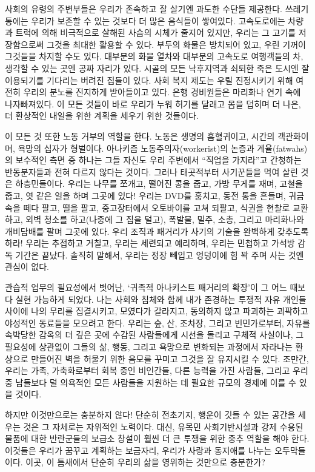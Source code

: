\documentclass[10pt, b6paper, openany]{memoir}
\begin{document}
\begin{article}
사회의 유령의 주변부들은 우리가 존속하고 잘 살기엔 과도한 수단들 제공한다. 쓰레기통에는 우리가 보존할 수 있는 것보다 더 많은 음식들이 쌓여있다. 고속도로에는 차량과 트럭에 의해 비극적으로 살해된 사슴의 시체가 줄지어 있지만, 우리는 그 고기를 저장함으로써 그것을 최대한 활용할 수 있다. 부두의 화물은 방치되어 있고, 우린 기꺼이 그것들을 차지할 수도 있다. 대부분의 화물 열차와 대부분의 고속도로 여행객들의 차, 생각할 수 있는 곳엔 공짜 자리가 있다. 시골의 모든 낙후지역과 쇠퇴한 죽은 도시엔 잘 이용되기를 기다리는 버려진 집들이 있다. 사회 복지 제도는 우릴 진정시키기 위해 여전히 우리의 분노를 진지하게 받아들이고 있다. 은행 경비원들은 마리화나 연기 속에 나자빠져있다. 이 모든 것들이 바로 우리가 누워 허기를 달래고 몸을 덥히며 더 나은, 더 환상적인 내일을 위한 계획을 세우기 위한 것들이다.

이 모든 것 또한 노동 거부의 역할을 한다. 노동은 생명의 흡혈귀이고, 시간의 객관화이며, 욕망의 십자가 형벌이다. 아나키즘 노동주의자(workerist)의 논증과 계율(fatwahs)의 보수적인 측면 중 하나는 그들 자신도 우리 주변에서 ``직업을 가지라''고 간청하는 반동분자들과 전혀 다르지 않다는 것이다. 그러나 태곳적부터 사기꾼들을 먹여 살린 것은 하층민들이다. 우리는 나무를 쪼개고, 떨어진 콩을 줍고, 가방 무게를 재며, 고철을 줍고, 엿 같은 일을 하며 그곳에 있다! 우리는 DVD를 훔치고, 동전 통을 흔들며, 귀금속을 떼다 팔고, 떨을 팔고, 중고장터에서 오토바이를 고쳐 되팔고, 식권을 현찰로 교환하고, 외벽 청소를 하고(나중에 그 집을 털고), 폭발물, 밀주, 소총, 그리고 마리화나와 개비담배를 팔며 그곳에 있다. 우리 조직과 패거리가 사기의 기술을 완벽하게 갖추도록 하라! 우리는 추접하고 거칠고, 우리는 세련되고 예리하며, 우리는 민첩하고 가석방 감독 기간은 끝났다. 솔직히 말해서, 우리는 정장 빼입고 엉덩이에 힘 꽉 주며 사는 것엔 관심이 없다.

관습적 업무의 필요성에서 벗어난, `귀족적 아나키스트 패거리의 확장'이 그 어느 때보다 실현 가능하게 되었다. 나는 사회와 침체와 함께 내가 존경하는 투쟁적 자유 개인들 사이에 나의 무리를 집결시키고, 모였다가 갈라지고, 동의하지 않고 파괴하는 괴팍하고 야성적인 동료들을 모으려고 한다. 우리는 숲, 산, 조차장, 그리고 빈민가로부터, 자유를 속박당한 감옥의 더 깊은 곳에 수감된 사람들에게 시선을 돌리고 구체적 사실이나, 그 필요성에 상관없이 그들의 삶, 행동, 그리고 욕망으로 변화되는 과정에서 자라나는 환상으로 만들어진 벽을 허물기 위한 음모를 꾸미고 그것을 잘 유지시킬 수 있다. 조만간, 우리는 가족, 가축화로부터 회복 중인 비인간들, 다른 능력을 가진 사람들, 그리고 우리 중 남들보다 덜 의욕적인 모든 사람들을 지원하는 데 필요한 규모의 경제에 이를 수 있을 것이다. 

하지만 이것만으로는 충분하지 않다! 단순히 전초기지, 행운이 깃들 수 있는 공간을 세우는 것은 그 자체로는 자위적인 노력이다. 대신, 유목민 사회기반시설과 강제 수용된 물품에 대한 반란군들의 보급소 창설이 훨씬 더 큰 투쟁을 위한 중추 역할을 해야 한다. 이것들은 우리가 꿈꾸고 계획하는 보금자리, 우리가 사랑과 동지애를 나누는 오두막들이다. 이곳, 이 틈새에서 단순히 우리의 삶을 영위하는 것만으로 충분한가? 


\end{article}
\end{document}
